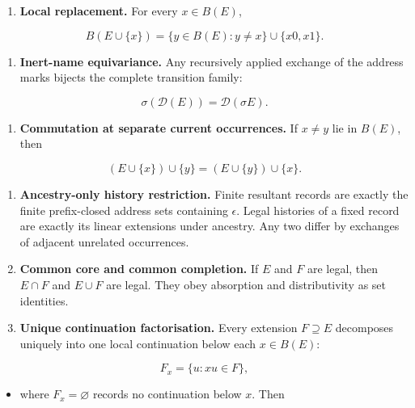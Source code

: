 \documentclass[11pt,a4paper]{article}
\begin{document}
\begin{enumerate}
\def\labelenumi{\arabic{enumi}.}
\item
  \textbf{Local replacement.} For every \(x \in B(E)\),
\end{enumerate}

\[B\left( E \cup \{ x\} \right) = \{ y \in B(E):y \neq x\} \cup \{ x0,x1\}.\]

\begin{enumerate}
\def\labelenumi{\arabic{enumi}.}
\setcounter{enumi}{1}
\item
  \textbf{Inert-name equivariance.} Any recursively applied exchange of
  the address marks bijects the complete transition family:
\end{enumerate}

\[\sigma\left( \mathcal{D}(E) \right) = \mathcal{D}(\sigma E).\]

\begin{enumerate}
\def\labelenumi{\arabic{enumi}.}
\setcounter{enumi}{2}
\item
  \textbf{Commutation at separate current occurrences.} If \(x \neq y\)
  lie in \(B(E)\), then
\end{enumerate}

\[\left( E \cup \{ x\} \right) \cup \{ y\} = \left( E \cup \{ y\} \right) \cup \{ x\}.\]

\begin{enumerate}
\def\labelenumi{\arabic{enumi}.}
\setcounter{enumi}{3}
\item
  \textbf{Ancestry-only history restriction.} Finite resultant records
  are exactly the finite prefix-closed address sets containing
  \(\epsilon\). Legal histories of a fixed record are exactly its linear
  extensions under ancestry. Any two differ by exchanges of adjacent
  unrelated occurrences.
\item
  \textbf{Common core and common completion.} If \(E\) and \(F\) are
  legal, then \(E \cap F\) and \(E \cup F\) are legal. They obey
  absorption and distributivity as set identities.
\item
  \textbf{Unique continuation factorisation.} Every extension
  \(F \supseteq E\) decomposes uniquely into one local continuation
  below each \(x \in B(E)\):
\end{enumerate}

\[F_{x} = \{ u:xu \in F\},\]

\begin{itemize}
\item
  where \(F_{x} = \varnothing\) records no continuation below \(x\).
  Then
\end{itemize}
\end{document}
